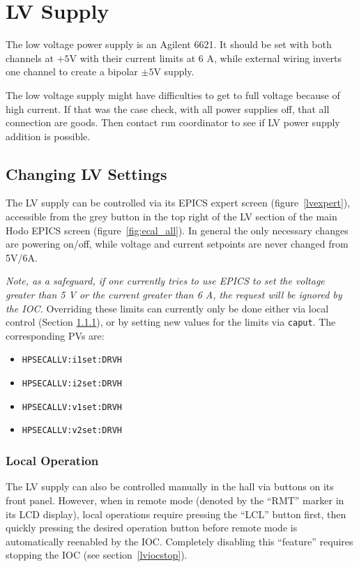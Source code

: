 \documentclass[12pt]{article}
\begin{document}
\newpage
   \section{LV Supply}
 The low voltage power supply is an Agilent 6621.  It should be set with both channels at $+5$V with their current limits at 6 A, while external wiring inverts one channel to create a bipolar $\pm5$V supply. 

      The low voltage supply might have difficulties to get to full voltage because of high current. If that was the case check, with all power supplies off, that all connection are goods. Then contact run coordinator to see if LV power supply addition is possible. 

\subsection{Changing LV Settings}
The LV supply can be controlled via its EPICS expert screen (figure~\ref{lvexpert}), accessible from the grey button in the top right of the LV section of the main Hodo EPICS screen (figure~\ref{fig:ecal_all}). In general the only necessary changes are powering on/off, while voltage and current setpoints are never changed from 5V/6A.


{\em Note, as a safeguard, if one currently tries to use EPICS to set the voltage greater than 5 V or the current greater than 6 A, the request will be ignored by the IOC.}  Overriding these limits can currently only be done either via local control (Section \ref{sec:lvlocalops}), or by setting new values for the limits via \texttt{caput}.  The corresponding PVs are:
{\footnotesize
\begin{itemize}
    \item\texttt{HPSECALLV:i1set:DRVH}
    \item\texttt{HPSECALLV:i2set:DRVH}
    \item\texttt{HPSECALLV:v1set:DRVH}
    \item\texttt{HPSECALLV:v2set:DRVH}
\end{itemize}
}

\subsubsection{Local Operation}\label{sec:lvlocalops}
The LV supply can also be controlled manually in the hall via buttons on its front panel.  However, when in remote mode (denoted by the ``RMT'' marker in its LCD display), local operations require pressing the ``LCL'' button first, then quickly pressing the desired operation button before remote mode is automatically reenabled by the IOC.  Completely disabling this ``feature'' requires stopping the IOC (see section~\ref{lviocstop}).
\end{document}
